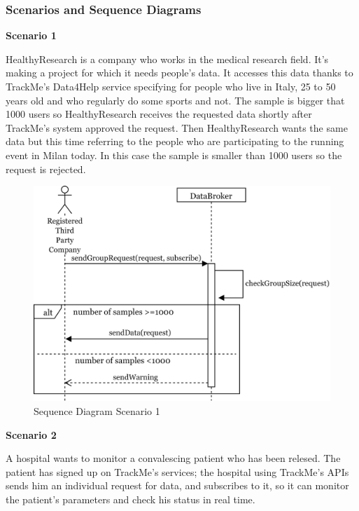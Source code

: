 \documentclass[../main.tex]{subfiles}
\begin{document}
	\subsubsection{Scenarios and Sequence Diagrams}
		\begin{minipage}{\textwidth}
			{\bf Scenario 1}
			\vspace{3mm}

			HealthyResearch is a company who works in the medical research field. It's making a project for which it needs people's data. It accesses this data thanks to TrackMe's Data4Help service specifying for people who live in Italy, 25 to 50 years old and who regularly do some sports and not. The sample is bigger that 1000 users so HealthyResearch receives the requested data shortly after TrackMe's system approved the request.
			Then HealthyResearch wants the same data but this time referring to the people who are participating to the running event in Milan today. In this case the sample is smaller than 1000 users so the request is rejected.

			\vspace{5mm}
		\end{minipage}
		\begin{figure}[H]
			\centering
			\includegraphics[scale=.08]{images/sequenceDiagram1.png}
			\caption{Sequence Diagram Scenario 1 \label{fig:Sequence Diagram Scenario 1}}
		\end{figure}
		\begin{minipage}{\textwidth}
			{\bf Scenario 2}
			\vspace{3mm}

			A hospital wants to monitor a convalescing patient who has been relesed. The patient has signed up on TrackMe's services; the hospital using TrackMe's APIs sends him an individual request for data, and subscribes to it, so it can monitor the patient's parameters and check his status in real time.
			\vspace{5mm}
		\end{minipage}
\end{document}
